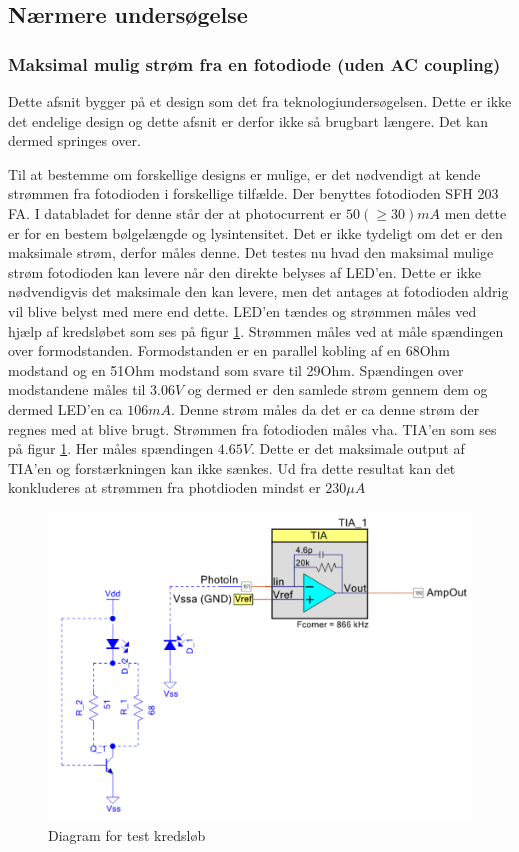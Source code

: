 \documentclass[HardwareDesign/HardwareDesign_main.tex]{subfiles}
\begin{document}
\subsection{Nærmere undersøgelse}
\subsubsection{Maksimal mulig strøm fra en fotodiode (uden AC coupling)} \label{sec:CupSensorCurrentTest}
{
Dette afsnit bygger på et design som det fra teknologiundersøgelsen. Dette er ikke det endelige design og dette afsnit er derfor ikke så brugbart længere. Det kan dermed springes over.

Til at bestemme om forskellige designs er mulige, er det nødvendigt at kende strømmen fra fotodioden i forskellige tilfælde.
Der benyttes fotodioden SFH 203 FA. I databladet for denne står der at photocurrent er $50 (≥ 30) \si{mA}$ men dette er for en bestem bølgelængde og lysintensitet. Det er ikke tydeligt om det er den maksimale strøm, derfor måles denne.
Det testes nu hvad den maksimal mulige strøm fotodioden kan levere når den direkte belyses af LED'en. Dette er ikke nødvendigvis det maksimale den kan levere, men det antages at fotodioden aldrig vil blive belyst med mere end dette.
LED'en tændes og strømmen måles ved hjælp af kredsløbet som ses på figur \ref{fig:PhotodiodeTestDiagram}. Strømmen måles ved at måle spændingen over formodstanden. Formodstanden er en parallel kobling af en 68Ohm modstand og en 51Ohm modstand som svare til 29Ohm. Spændingen over modstandene måles til $3.06\si{V}$ og dermed er den samlede strøm gennem dem og dermed LED'en ca $106\si{mA}$. Denne strøm måles da det er ca denne strøm der regnes med at blive brugt. Strømmen fra fotodioden måles vha. TIA'en som ses på figur \ref{fig:PhotodiodeTestDiagram}. Her måles spændingen $4.65V$. Dette er det maksimale output af TIA'en og forstærkningen kan ikke sænkes. Ud fra dette resultat kan det konkluderes at strømmen fra photdioden mindst er $230\si{\mu A}$

\begin{figure}[H]
    \centering
    \includegraphics[width=\textwidth]{HardwareDesign/CupSensor/graphics/DiodeCurrentTestDiagram.PNG}
    \caption{Diagram for test kredsløb}
    \label{fig:PhotodiodeTestDiagram}
\end{figure}

}
\end{document}
